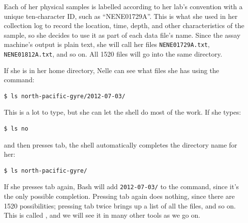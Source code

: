 \documentclass{book}
\begin{document}
Each of her physical samples is labelled according to her lab's
convention with a unique ten-character ID, such as ``NENE01729A''. This
is what she used in her collection log to record the location, time,
depth, and other characteristics of the sample, so she decides to use it
as part of each data file's name. Since the assay machine's output is
plain text, she will call her files \texttt{NENE01729A.txt},
\texttt{NENE01812A.txt}, and so on. All 1520 files will go into the same
directory.

If she is in her home directory, Nelle can see what files she has using
the command:

\begin{verbatim}
$ ls north-pacific-gyre/2012-07-03/
\end{verbatim}

This is a lot to type, but she can let the shell do most of the work. If
she types:

\begin{verbatim}
$ ls no
\end{verbatim}

and then presses tab, the shell automatically completes the directory
name for her:

\begin{verbatim}
$ ls north-pacific-gyre/
\end{verbatim}

If she presses tab again, Bash will add \texttt{2012-07-03/} to the
command, since it's the only possible completion. Pressing tab again
does nothing, since there are 1520 possibilities; pressing tab twice
brings up a list of all the files, and so on. This is called
, and we will see it in many
other tools as we go on.
\end{document}
